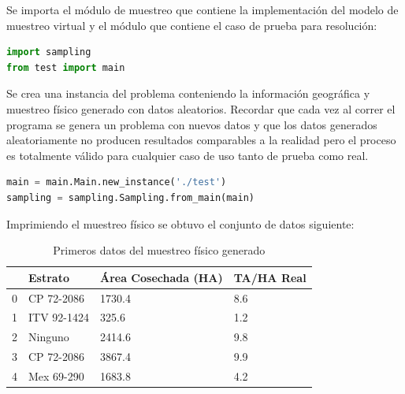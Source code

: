 Se importa el módulo de muestreo que contiene la implementación del modelo de muestreo virtual y el módulo que contiene el caso de prueba para resolución:

\bigbreak

\begin{lstlisting}[language=Python, caption=Importar dependencias]
import sampling
from test import main
\end{lstlisting}

\bigbreak

Se crea una instancia del problema conteniendo la información geográfica y muestreo físico generado con datos aleatorios. Recordar que cada vez al correr el programa se genera un problema con nuevos datos y que los datos generados aleatoriamente no producen resultados comparables a la realidad pero el proceso es totalmente válido para cualquier caso de uso tanto de prueba como real.

\bigbreak

\begin{lstlisting}[language=Python, caption=Importar dependencias]
main = main.Main.new_instance('./test')
sampling = sampling.Sampling.from_main(main)
\end{lstlisting}

\bigbreak

Imprimiendo el muestreo físico se obtuvo el conjunto de datos siguiente:

\begin{table}[H]
    \centering
    \begin{tabular}{|l|l|l|l|}
    \hline
    \rowcolor[HTML]{CBCEFB}
    \textbf{} & \textbf{Estrato} & \textbf{Área Cosechada (HA)} & \textbf{TA/HA Real} \\ \hline
    0         & CP 72-2086       & 1730.4                       & 8.6                 \\ \hline
    \rowcolor[HTML]{EFEFEF}
    1         & ITV 92-1424      & 325.6                        & 1.2                 \\ \hline
    2         & Ninguno          & 2414.6                       & 9.8                 \\ \hline
    \rowcolor[HTML]{EFEFEF}
    3         & CP 72-2086       & 3867.4                       & 9.9                 \\ \hline
    4         & Mex 69-290       & 1683.8                       & 4.2                 \\ \hline
    \end{tabular}
    \caption{Primeros datos del muestreo físico generado}
\end{table}

